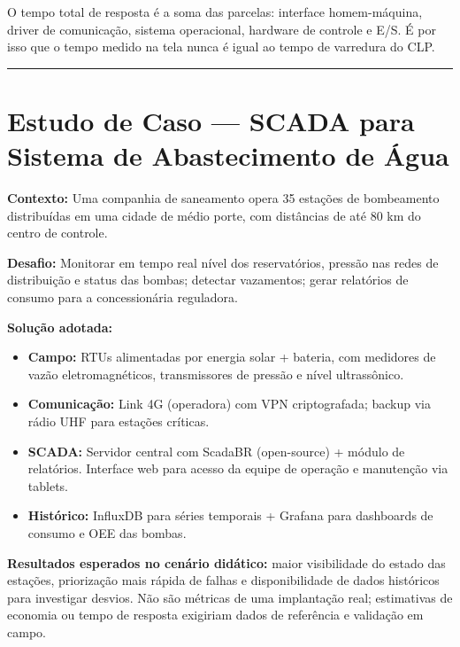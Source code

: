 O tempo total de resposta é a soma das parcelas: interface homem-máquina, driver de comunicação,
sistema operacional, hardware de controle e E/S. É por isso que o tempo medido na tela nunca é
igual ao tempo de varredura do CLP.

\begin{center}\rule{0.5\linewidth}{0.5pt}\end{center}

\section{\texorpdfstring{Estudo de Caso --- SCADA para Sistema de Abastecimento de Água}{Estudo de Caso  SCADA para Sistema de Abastecimento de Água}}\label{estudo-de-caso-scada-para-sistema-de-abastecimento-de-uxe1gua}

\textbf{Contexto:} Uma companhia de saneamento opera 35 estações de bombeamento distribuídas em uma cidade de médio porte, com distâncias de até 80 km do centro de controle.

\textbf{Desafio:} Monitorar em tempo real nível dos reservatórios, pressão nas redes de distribuição e status das bombas; detectar vazamentos; gerar relatórios de consumo para a concessionária reguladora.

\textbf{Solução adotada:}

\begin{itemize}
\tightlist
\item
  \textbf{Campo:} RTUs alimentadas por energia solar + bateria, com medidores de vazão eletromagnéticos, transmissores de pressão e nível ultrassônico.
\item
  \textbf{Comunicação:} Link 4G (operadora) com VPN criptografada; backup via rádio UHF para estações críticas.
\item
  \textbf{SCADA:} Servidor central com ScadaBR (open-source) + módulo de relatórios. Interface web para acesso da equipe de operação e manutenção via tablets.
\item
  \textbf{Histórico:} InfluxDB para séries temporais + Grafana para dashboards de consumo e OEE das bombas.
\end{itemize}

\textbf{Resultados esperados no cenário didático:} maior visibilidade do estado das estações, priorização mais rápida de falhas e disponibilidade de dados históricos para investigar desvios. Não são métricas de uma implantação real; estimativas de economia ou tempo de resposta exigiriam dados de referência e validação em campo.

